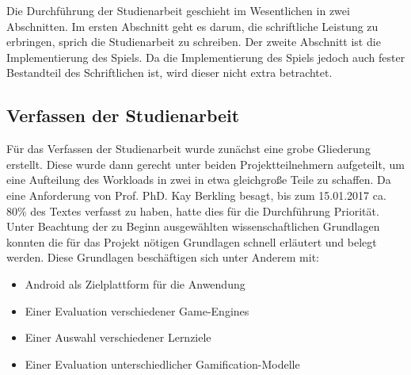 	Die Durchführung der Studienarbeit geschieht im Wesentlichen in zwei Abschnitten. Im ersten Abschnitt geht es darum, die schriftliche Leistung zu erbringen, sprich die Studienarbeit zu schreiben. Der zweite Abschnitt ist die Implementierung des Spiels. Da die Implementierung des Spiels jedoch auch fester Bestandteil des Schriftlichen ist, wird dieser nicht extra betrachtet.

	\subsection{Verfassen der Studienarbeit}
	Für das Verfassen der Studienarbeit wurde zunächst eine grobe Gliederung erstellt. Diese wurde dann gerecht unter beiden Projektteilnehmern aufgeteilt, um eine Aufteilung des Workloads in zwei in etwa gleichgroße Teile zu schaffen. Da eine Anforderung von Prof. PhD. Kay Berkling besagt, bis zum 15.01.2017 ca. 80\% des Textes verfasst zu haben, hatte dies für die Durchführung Priorität.
	Unter Beachtung der zu Beginn ausgewählten wissenschaftlichen Grundlagen konnten die für das Projekt nötigen Grundlagen schnell erläutert und belegt werden. Diese Grundlagen beschäftigen sich unter Anderem mit:
	\begin{itemize}
		\item{Android als Zielplattform für die Anwendung}
		\item{Einer Evaluation verschiedener Game-Engines}
		\item{Einer Auswahl verschiedener Lernziele}
		\item{Einer Evaluation unterschiedlicher Gamification-Modelle}
	\end{itemize}

